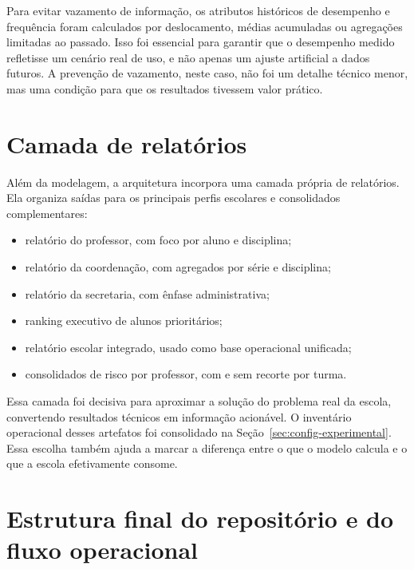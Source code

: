 Para evitar vazamento de informa\c{c}\~ao, os atributos hist\'oricos de desempenho e frequ\^encia foram calculados por deslocamento, m\'edias acumuladas ou agrega\c{c}\~oes limitadas ao passado. Isso foi essencial para garantir que o desempenho medido refletisse um cen\'ario real de uso, e n\~ao apenas um ajuste artificial a dados futuros. A preven\c{c}\~ao de vazamento, neste caso, n\~ao foi um detalhe t\'ecnico menor, mas uma condi\c{c}\~ao para que os resultados tivessem valor pr\'atico.

\section{Camada de relat\'orios}
\label{sec:saidas-geradas-pipeline}
\label{sec:camada-relatorios}

Al\'em da modelagem, a arquitetura incorpora uma camada pr\'opria de relat\'orios. Ela organiza sa\'idas para os principais perfis escolares e consolidados complementares:
\begin{itemize}
    \item relat\'orio do professor, com foco por aluno e disciplina;
    \item relat\'orio da coordena\c{c}\~ao, com agregados por s\'erie e disciplina;
    \item relat\'orio da secretaria, com \^enfase administrativa;
    \item ranking executivo de alunos priorit\'arios;
    \item relat\'orio escolar integrado, usado como base operacional unificada;
    \item consolidados de risco por professor, com e sem recorte por turma.
\end{itemize}

Essa camada foi decisiva para aproximar a solu\c{c}\~ao do problema real da escola, convertendo resultados t\'ecnicos em informa\c{c}\~ao acion\'avel. O invent\'ario operacional desses artefatos foi consolidado na Se\c{c}\~ao~\ref{sec:config-experimental}. Essa escolha tamb\'em ajuda a marcar a diferen\c{c}a entre o que o modelo calcula e o que a escola efetivamente consome.

\section{Estrutura final do reposit\'orio e do fluxo operacional}
\label{sec:organizacao-pacote-school-predictor}
\label{sec:estrutura-final}

